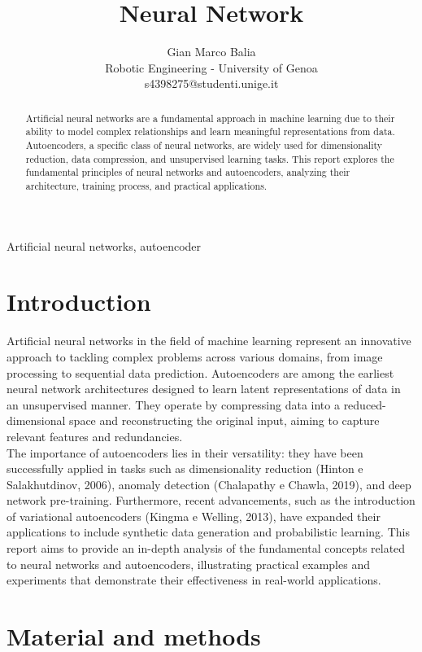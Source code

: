 \documentclass[9pt,technote]{IEEEtran}
\title{Neural Network}
\author{
	Gian Marco Balia\\
	Robotic Engineering - University of Genoa\\
	s4398275@studenti.unige.it
}
\begin{document}
\maketitle

\begin{abstract}
Artificial neural networks are a fundamental approach in machine learning due to their ability to model complex relationships and learn meaningful representations from data. Autoencoders, a specific class of neural networks, are widely used for dimensionality reduction, data compression, and unsupervised learning tasks. This report explores the fundamental principles of neural networks and autoencoders, analyzing their architecture, training process, and practical applications.
\end{abstract}
\begin{IEEEkeywords}
Artificial neural networks, autoencoder
\end{IEEEkeywords}

\section{Introduction}
Artificial neural networks in the field of machine learning represent an innovative approach to tackling complex problems across various domains, from image processing to sequential data prediction. Autoencoders are among the earliest neural network architectures designed to learn latent representations of data in an unsupervised manner. They operate by compressing data into a reduced-dimensional space and reconstructing the original input, aiming to capture relevant features and redundancies. \\
The importance of autoencoders lies in their versatility: they have been successfully applied in tasks such as dimensionality reduction (Hinton e Salakhutdinov, 2006), anomaly detection (Chalapathy e Chawla, 2019), and deep network pre-training. Furthermore, recent advancements, such as the introduction of variational autoencoders (Kingma e Welling, 2013), have expanded their applications to include synthetic data generation and probabilistic learning. This report aims to provide an in-depth analysis of the fundamental concepts related to neural networks and autoencoders, illustrating practical examples and experiments that demonstrate their effectiveness in real-world applications.
\section{Material and methods}
\end{document}
